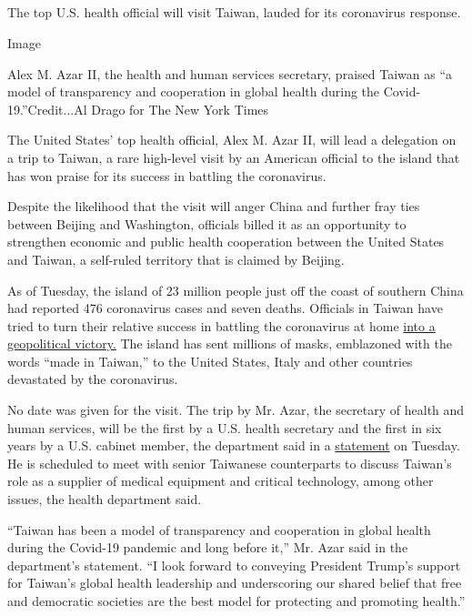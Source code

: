 \hypertarget{-3}{%
\subsection{}\label{-3}}

The top U.S. health official will visit Taiwan, lauded for its
coronavirus response.

Image

Alex M. Azar II, the health and human services secretary, praised Taiwan
as ``a model of transparency and cooperation in global health during the
Covid-19.''Credit...Al Drago for The New York Times

The United States' top health official, Alex M. Azar II, will lead a
delegation on a trip to Taiwan, a rare high-level visit by an American
official to the island that has won praise for its success in battling
the coronavirus.

Despite the likelihood that the visit will anger China and further fray
ties between Beijing and Washington, officials billed it as an
opportunity to strengthen economic and public health cooperation between
the United States and Taiwan, a self-ruled territory that is claimed by
Beijing.

As of Tuesday, the island of 23 million people just off the coast of
southern China had reported 476 coronavirus cases and seven deaths.
Officials in Taiwan have tried to turn their relative success in
battling the coronavirus at home
\href{https://www.nytimes.com/2020/04/22/world/asia/coronavirus-china-taiwan.html?searchResultPosition=4}{into
a geopolitical victory.} The island has sent millions of masks,
emblazoned with the words ``made in Taiwan,'' to the United States,
Italy and other countries devastated by the coronavirus.

No date was given for the visit. The trip by Mr. Azar, the secretary of
health and human services, will be the first by a U.S. health secretary
and the first in six years by a U.S. cabinet member, the department said
in a
\href{https://www.hhs.gov/about/news/2020/08/04/hhs-secretary-alex-azar-lead-delegation-taiwan-in-first-visit-by-us-hhs-secretary.html}{statement}
on Tuesday. He is scheduled to meet with senior Taiwanese counterparts
to discuss Taiwan's role as a supplier of medical equipment and critical
technology, among other issues, the health department said.

``Taiwan has been a model of transparency and cooperation in global
health during the Covid-19 pandemic and long before it,'' Mr. Azar said
in the department's statement. ``I look forward to conveying President
Trump's support for Taiwan's global health leadership and underscoring
our shared belief that free and democratic societies are the best model
for protecting and promoting health.''

